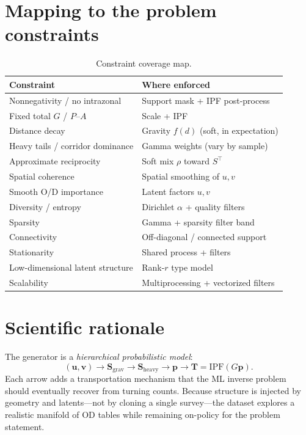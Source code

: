 \documentclass[11pt,a4paper]{report}
\newcommand{\mathbfu}{\mathbf{u}}
\newcommand{\mathbfv}{\mathbf{v}}
\newcommand{\mathbfS}{\mathbf{S}}
\newcommand{\mathbfp}{\mathbf{p}}
\begin{document}
\section{Mapping to the problem constraints}

\begin{table}[ht]
\centering
\caption{Constraint coverage map.}
\label{tab:fp-coverage}
\small
\begin{tabular}{@{}p{4.2cm}p{9.0cm}@{}}
\toprule
\textbf{Constraint} & \textbf{Where enforced} \\
\midrule
Nonnegativity / no intrazonal & Support mask + IPF post-process \\
Fixed total $G$ / $P$--$A$ & Scale + IPF \\
Distance decay & Gravity $f(d)$ (soft, in expectation) \\
Heavy tails / corridor dominance & Gamma weights (vary by sample) \\
Approximate reciprocity & Soft mix $\rho$ toward $S^\top$ \\
Spatial coherence & Spatial smoothing of $u,v$ \\
Smooth O/D importance & Latent factors $u,v$ \\
Diversity / entropy & Dirichlet $\alpha$ + quality filters \\
Sparsity & Gamma + sparsity filter band \\
Connectivity & Off-diagonal / connected support \\
Stationarity & Shared process + filters \\
Low-dimensional latent structure & Rank-$r$ type model \\
Scalability & Multiprocessing + vectorized filters \\
\bottomrule
\end{tabular}
\end{table}

\section{Scientific rationale}

The generator is a \emph{hierarchical probabilistic model}:
\[
  (\mathbfu,\mathbfv)
  \to \mathbfS_{\mathrm{grav}}
  \to \mathbfS_{\mathrm{heavy}}
  \to \mathbfp
  \to \mathbf{T}=\mathrm{IPF}(G\mathbfp).
\]
Each arrow adds a transportation mechanism that the ML inverse problem should eventually recover from turning counts. Because structure is injected by geometry and latents---not by cloning a single survey---the dataset explores a realistic manifold of OD tables while remaining on-policy for the problem statement.
\end{document}
